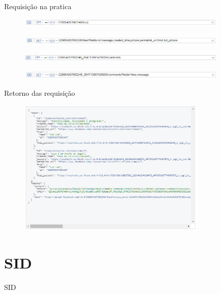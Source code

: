 \documentclass{aula-ifb}
\begin{document}
\begin{frame}{Requisição na pratica}
	\begin{figure}[h]
		\includegraphics[width=10cm]{figuras/requisicao3.png}
		\label{fig:facebookgraph}
	\end{figure}

	\begin{figure}[h]
		\includegraphics[width=10cm]{figuras/requisicao1.png}
		\label{fig:facebookgraph}
	\end{figure}
	
	\begin{figure}[h]
		\includegraphics[width=10cm]{figuras/requisicao4.png}
		\label{fig:facebookgraph}
	\end{figure}
	
	\begin{figure}[h]
		\includegraphics[width=10cm]{figuras/requisicao5.png}
		\label{fig:facebookgraph}
	\end{figure}
\end{frame}

\begin{frame}{Retorno das requisição}
\begin{figure}[h]
\includegraphics[width=9cm]{figuras/requisicao2.png}
\label{fig:facebookgraph}
\end{figure}
\end{frame}

\section{SID}
\begin{frame}
SID
\end{frame}
\end{document}
